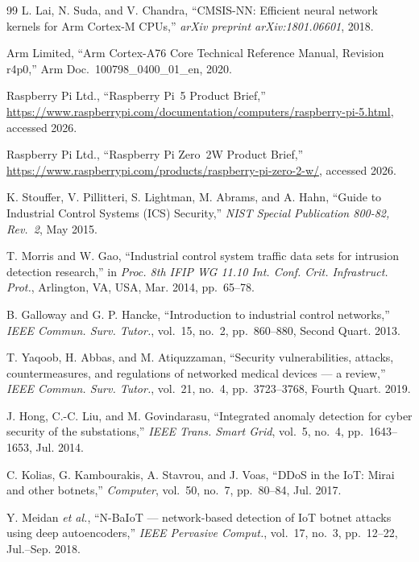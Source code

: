\documentclass[journal,10pt]{IEEEtran}
\begin{document}
\begin{thebibliography}{99}
L. Lai, N. Suda, and V. Chandra,
``CMSIS-NN: Efficient neural network kernels for Arm Cortex-M CPUs,''
\emph{arXiv preprint arXiv:1801.06601}, 2018.

Arm Limited,
``Arm Cortex-A76 Core Technical Reference Manual, Revision r4p0,''
Arm Doc.~100798\_0400\_01\_en, 2020.

Raspberry Pi Ltd.,
``Raspberry Pi~5 Product Brief,''
\url{https://www.raspberrypi.com/documentation/computers/raspberry-pi-5.html},
accessed 2026.

Raspberry Pi Ltd.,
``Raspberry Pi Zero~2W Product Brief,''
\url{https://www.raspberrypi.com/products/raspberry-pi-zero-2-w/},
accessed 2026.

K. Stouffer, V. Pillitteri, S. Lightman, M. Abrams, and A. Hahn,
``Guide to Industrial Control Systems (ICS) Security,''
\emph{NIST Special Publication 800-82, Rev.~2}, May 2015.

T. Morris and W. Gao,
``Industrial control system traffic data sets for intrusion detection
research,''
in \emph{Proc. 8th IFIP WG 11.10 Int. Conf. Crit. Infrastruct. Prot.},
Arlington, VA, USA, Mar. 2014, pp.~65--78.

B. Galloway and G. P. Hancke,
``Introduction to industrial control networks,''
\emph{IEEE Commun. Surv. Tutor.}, vol.~15, no.~2, pp.~860--880,
Second Quart. 2013.

T. Yaqoob, H. Abbas, and M. Atiquzzaman,
``Security vulnerabilities, attacks, countermeasures, and regulations
of networked medical devices --- a review,''
\emph{IEEE Commun. Surv. Tutor.}, vol.~21, no.~4, pp.~3723--3768,
Fourth Quart. 2019.

J. Hong, C.-C. Liu, and M. Govindarasu,
``Integrated anomaly detection for cyber security of the substations,''
\emph{IEEE Trans. Smart Grid}, vol.~5, no.~4, pp.~1643--1653,
Jul. 2014.

C. Kolias, G. Kambourakis, A. Stavrou, and J. Voas,
``DDoS in the IoT: Mirai and other botnets,''
\emph{Computer}, vol.~50, no.~7, pp.~80--84, Jul. 2017.

Y. Meidan \emph{et al.},
``N-BaIoT --- network-based detection of IoT botnet attacks using
deep autoencoders,''
\emph{IEEE Pervasive Comput.}, vol.~17, no.~3, pp.~12--22,
Jul.--Sep. 2018.


\end{thebibliography}
\end{document}
